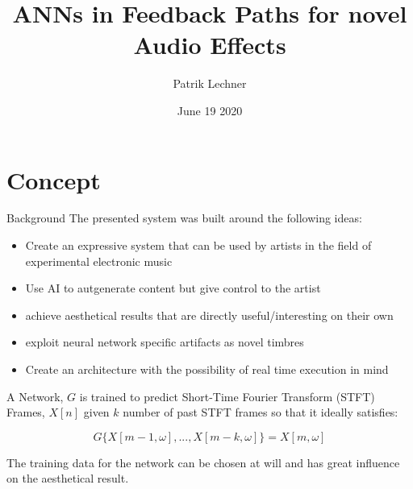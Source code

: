 \documentclass{beamer}
\title{ANNs in Feedback Paths for novel Audio Effects}
\author{Patrik Lechner\texorpdfstring{\\}{,} }
\institute{IC\textbackslash M/T \\ FH Stp.}
\date{June 19 2020}
\begin{document}
    \begin{frame}
        \maketitle
    \end{frame}
    
	\section{Concept}
	
    \begin{frame}{Background}
    	The presented system was built around the following ideas:
    	\begin{itemize}
        \item Create an expressive system that can be used by artists in the field of experimental electronic music
        \item Use AI to autgenerate content but give control to the artist
        \item achieve aesthetical results that are directly useful/interesting on their own
		\item exploit neural network specific artifacts as novel timbres
		\item Create an architecture with the possibility of real time execution in mind
        \end{itemize} 
    \end{frame}


	\begin{frame}
		A Network, $G$ is trained to predict Short-Time Fourier Transform (STFT) Frames, $X[n]$ given $k$ number of 
		past STFT frames so that it ideally satisfies:
		
		\begin{equation}
			G\{X[m-1, \omega],..., X[m-k, \omega]\}=X[m, \omega]
		\end{equation}

		The training data for the network can be chosen at will and has great influence on the aesthetical result. 
		

	\end{frame}
\end{document}
